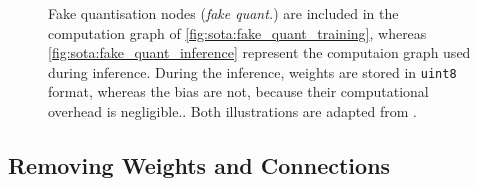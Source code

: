 \begin{figure}[htbp]
  \centering
  \caption{Fake quantisation nodes (\emph{fake quant.}) are included in the
    computation graph of \cref{fig:sota:fake_quant_training}, whereas
    \cref{fig:sota:fake_quant_inference} represent the computaion graph used during
    inference. During the inference, weights are stored in \texttt{uint8} format,
    whereas the bias are not, because their computational overhead is
    negligible.\cite{DBLP:conf/cvpr/JacobKCZTHAK18}. Both illustrations are adapted
    from \cite{DBLP:conf/cvpr/JacobKCZTHAK18}.}
  \label{fig:sota:fake_quant}
\end{figure}

\subsection{Removing Weights and Connections}\label{sec:sota:pruning}

